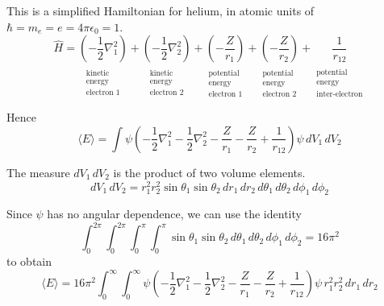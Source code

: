 This is a simplified Hamiltonian for helium, in atomic units of $\hbar=m_e=e=4\pi\epsilon_0=1$.
\begin{equation*}
\hat{H}=
\underset{\substack{\\[1ex]\text{kinetic}\\\text{energy}\\\text{electron 1}}}{\left(-\frac{1}{2}\nabla^2_1\right)}
+\underset{\substack{\\[1ex]\text{kinetic}\\\text{energy}\\\text{electron 2}}}{\left(-\frac{1}{2}\nabla^2_2\right)}
+\underset{\substack{\\[1ex]\text{potential}\\\text{energy}\\\text{electron 1}}}{\left(-\frac{Z}{r_1}\right)}
+\underset{\substack{\\[1ex]\text{potential}\\\text{energy}\\\text{electron 2}}}{\left(-\frac{Z}{r_2}\right)}
+\underset{\substack{\\[1ex]\text{potential}\\\text{energy}\\\text{inter-electron}}}{\frac{1}{r_{12}}}
\end{equation*}

Hence
\begin{equation*}
\langle E\rangle=
\int\psi\left(
-\frac{1}{2}\nabla^2_1
-\frac{1}{2}\nabla^2_2
-\frac{Z}{r_1}
-\frac{Z}{r_2}
+\frac{1}{r_{12}}
\right)\psi\,dV_1\,dV_2
\end{equation*}

The measure $dV_1\,dV_2$ is the product of two volume elements.
\begin{equation*}
dV_1\,dV_2=r_1^2 r_2^2 \sin\theta_1 \sin\theta_2
\,dr_1\,dr_2\,d\theta_1\,d\theta_2\,d\phi_1\,d\phi_2
\end{equation*}

Since $\psi$ has no angular dependence, we can use the identity
\begin{equation*}
\int_0^{2\pi}\int_0^{2\pi}\int_0^\pi\int_0^\pi\sin\theta_1\sin\theta_2
\,d\theta_1\,d\theta_2\,d\phi_1\,d\phi_2=16\pi^2
\tag{1}
\end{equation*}
to obtain
\begin{equation*}
\langle E\rangle=16\pi^2\int_0^\infty\int_0^\infty
\psi\left(
-\frac{1}{2}\nabla^2_1
-\frac{1}{2}\nabla^2_2
-\frac{Z}{r_1}
-\frac{Z}{r_2}
+\frac{1}{r_{12}}
\right)\psi
\,r_1^2 r_2^2
\,dr_1\,dr_2
\end{equation*}

